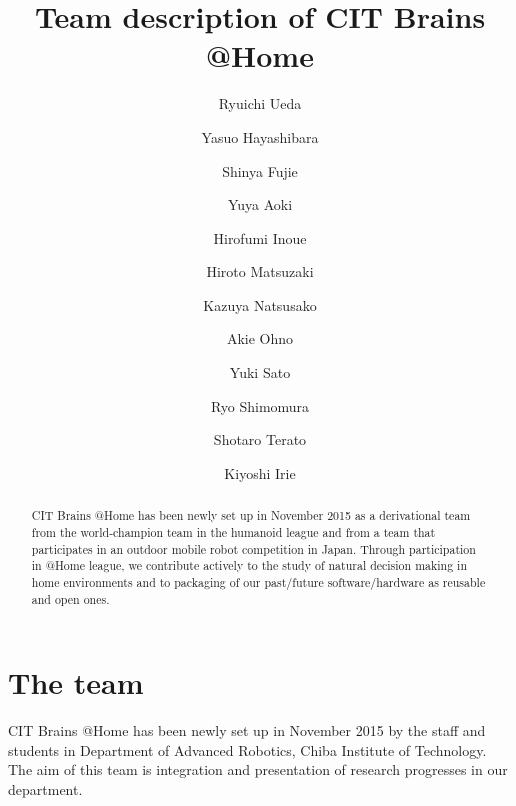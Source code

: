 \documentclass{llncs}
\begin{document}
\title{Team description of CIT Brains @Home}

\author{Ryuichi Ueda \and
Yasuo Hayashibara \and
Shinya Fujie \and
Yuya Aoki \and
Hirofumi Inoue \and
Hiroto Matsuzaki \and
Kazuya Natsusako \and
Akie Ohno \and
Yuki Sato \and
Ryo Shimomura \and
Shotaro Terato \and
Kiyoshi Irie
}


\maketitle
%
\begin{abstract}
CIT Brains @Home has been newly set up in November 2015
as a derivational team from the world-champion team
in the humanoid league and from a team that participates in
an outdoor mobile robot competition in Japan.
Through participation in @Home league,
we contribute actively to the study of natural decision making
in home environments and to packaging of our past/future
software/hardware as reusable and open ones.
\end{abstract}

\section{The team}

CIT Brains @Home has been newly set up in November 2015
by the staff and students in Department of Advanced Robotics,
Chiba Institute of Technology.
The aim of this team is integration and presentation
of research progresses in our department.
\end{document}
